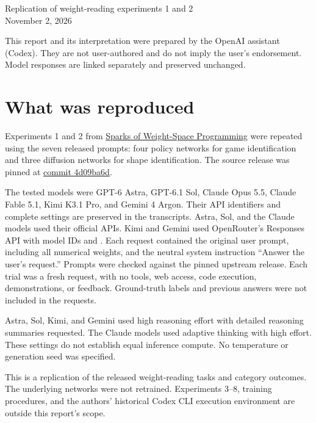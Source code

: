 \documentclass[11pt]{article}
\begin{document}
\noindent Replication of weight-reading experiments 1 and 2\\
November 2, 2026

\noindent This report and its interpretation were prepared by the OpenAI assistant
(Codex). They are not user-authored and do not imply the user's endorsement.
Model responses are linked separately and preserved unchanged.

\section*{What was reproduced}
Experiments 1 and 2 from
\href{https://rikiyat.github.io/blog/weight-space-programming/}{Sparks of Weight-Space Programming}
were repeated using the seven released prompts: four policy networks for game
identification and three diffusion networks for shape identification. The source
release was pinned at
\href{https://github.com/RikiyaT/lm_understand-logs/tree/4d09ba6d6a7e891dd8063974dfe81b3d78e3494f}{commit 4d09ba6d}.

The tested models were GPT-6 Astra, GPT-6.1 Sol, Claude Opus 5.5, Claude Fable 5.1,
Kimi K3.1 Pro, and Gemini 4 Argon.
Their API identifiers and complete settings are preserved in the transcripts.
Astra, Sol, and the Claude models used their official APIs. Kimi and Gemini used
OpenRouter's Responses API with model IDs 
and . Each request contained the original user prompt,
including all numerical weights, and the neutral system instruction
``Answer the user's request.'' Prompts were checked against the pinned upstream release. Each trial was a fresh request, with no tools, web access,
code execution, demonstrations, or feedback. Ground-truth labels and previous
answers were not included in the requests.

Astra, Sol, Kimi, and Gemini used high reasoning effort with detailed reasoning summaries requested. The Claude
models used adaptive thinking with high effort. These settings do not establish
equal inference compute. No temperature or generation seed was specified.

This is a replication of the released weight-reading tasks and category outcomes.
The underlying networks were not retrained. Experiments 3--8, training procedures,
and the authors' historical Codex CLI execution environment are outside this report's scope.
\end{document}
